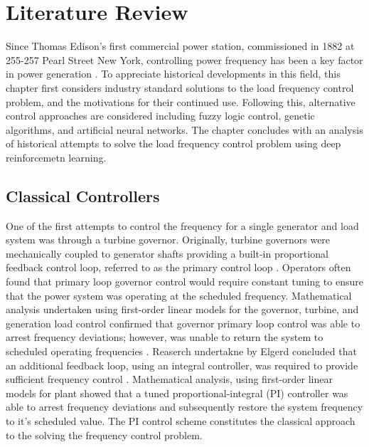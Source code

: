 \chapter{Literature Review}
Since Thomas Edison's first commercial power station, commissioned in 1882 at 255-257 Pearl Street New York, controlling power frequency has been a key factor in power generation \cite{Cohn1983}. To appreciate historical developments in this field, this chapter first considers industry standard solutions to the load frequency control problem, and the motivations for their continued use. Following this, alternative control approaches are considered including fuzzy logic control, genetic algorithms, and artificial neural networks. The chapter concludes with an analysis of historical attempts to solve the load frequency control problem using deep reinforcemetn learning.

\section{Classical Controllers}\label{agc}
One of the first attempts to control the frequency for a single generator and load system was through a turbine governor. Originally, turbine governors were mechanically coupled to generator shafts providing a built-in proportional feedback control loop, referred to as the primary control loop \cite{Bevrani2011}. Operators often found that primary loop governor control would require constant tuning to ensure that the power system was operating at the scheduled frequency. Mathematical analysis undertaken using first-order linear models for the governor, turbine, and generation load control confirmed that governor primary loop control was able to arrest frequency deviations; however, was unable to return the system to scheduled operating frequencies \cite{Saadat2011}. Reaserch undertakne by Elgerd concluded that an additional feedback loop, using an integral controller, was required to provide sufficient frequency control \cite{Elgerd1970}. Mathematical analysis, using first-order linear models for plant showed that a tuned proportional-integral (PI) controller was able to arrest frequency deviations and subsequently restore the system frequency to it's scheduled value. The PI control scheme constitutes the classical approach to the solving the frequency control problem.

